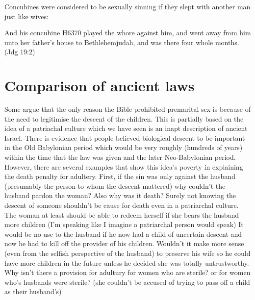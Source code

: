\documentclass[11pt]{article}
\begin{document}
Concubines were considered to be sexually sinning if they slept with another man just like wives:

And his concubine H6370 played the whore against him, and went away from him unto her father's house to Bethlehemjudah, and was there four whole months. (Jdg 19:2)


\section{Comparison of ancient laws}


Some argue that the only reason the Bible prohibited premarital sex is because of the need to legitimise the descent of the children. This is partially based on the idea of a patriachal culture which we have seen is an inapt description of ancient Israel. There is evidence that people believed biological descent to be important in the Old Babylonian period\cite{son of p} which would be very roughly (hundreds of years) within the time that the law was given and the later Neo-Babylonian period. \cite{exorcist in emar} However, there are several examples that show this idea's poverty in explaining the death penalty for adultery. First, if the sin was only against the husband (presumably the person to whom the descent mattered) why couldn't the husband pardon the woman? Also why was it death? Surely not knowing the descent of someone shouldn't be cause for death even in a patriarchal culture. The woman at least should be able to redeem herself if she bears the husband more children (I'm speaking like I imagine a patriarchal person would speak) It would be no use to the husband if he now had a child of uncertain descent and now he had to kill off the provider of his children. Wouldn't it make more sense (even from the selfish perspective of the husband) to preserve his wife so he could have more children in the future unless he decided she was totally untrustworthy. Why isn't there a provision for adultury for women who are sterile? or for women who's husbands were sterile? (she couldn't be accused of trying to pass off a child as their husband's) 
\end{document}
